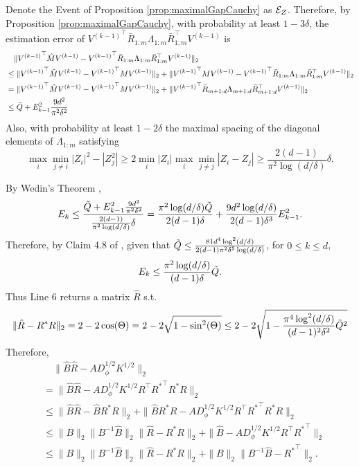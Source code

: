 Denote the Event of Proposition \ref{prop:maximalGapCauchy} as $\mathcal{E}_{Z}$.
Therefore, by Proposition \ref{prop:maximalGapCauchy}, with probability at least $1-3\delta$, 
the estimation error of ${V^{(k-1)}}^\top\bar{R}_{1:m}\Lambda_{1:m} \bar{R}_{1:m}^{\top} V^{(k-1)}$ is 
\begin{align*}
& \quad \| {V^{(k-1)}}^\top \hat{M}V^{(k-1)} - {V^{(k-1)}}^\top\bar{R}_{1:m}\Lambda_{1:m} \bar{R}_{1:m}^{\top} V^{(k-1)} \|_2 \\
& \le \|{V^{(k-1)}}^\top \hat{M}V^{(k-1)} - {V^{(k-1)}}^\top MV^{(k-1)}\|_2 + \| {V^{(k-1)}}^\top MV^{(k-1)} -{V^{(k-1)}}^\top\bar{R}_{1:m}\Lambda_{1:m} \bar{R}_{1:m}^{\top} V^{(k-1)} \|_2 \\
&  = \|{V^{(k-1)}}^\top \hat{M}V^{(k-1)} - {V^{(k-1)}}^\top MV^{(k-1)}\|_2 + \|{V^{(k-1)}}^\top\bar{R}_{m+1:d}\Lambda_{m+1:d}\bar{R}_{m+1:d}^{\top} V^{(k-1)} \|_2 \\
& \le \tilde{Q} + E_{k-1}^2 \frac{9d^2}{\pi^2\delta^2} 
\end{align*}
Also, with probability at least $1-2\delta$ the maximal spacing of the diagonal elements of $\Lambda_{1:m}$ satisfying
\[
\max_i\min_{j\neq i} |Z_i|^2 - |Z_j^2| \ge 2\min_i |Z_i| \max_i\min_{j\neq j} |Z_i - Z_j| \ge \frac{2(d-1)}{\pi^2 \log(d/\delta)}\delta.
\] 



By Wedin's Theorem \citep{stewart1990matrix}, 
\[
E_k \le \frac{\tilde{Q} + E_{k-1}^2 \frac{9d^2}{\pi^2\delta^2} }{\frac{2(d-1)}{\pi^2 \log(d/\delta)}\delta} = \frac{\pi^2 \log(d/\delta)\tilde{Q}}{2(d-1)\delta} + \frac{9d^2 \log(d/\delta)}{2(d-1)\delta^3}E_{k-1}^2.
\]
Therefore, by Claim 4.8 of \citet{vempala2014max}, given that $\tilde{Q}\le  \frac{81d^4\log^2(d/\delta)}{2(d-1)\pi^2\delta^5\log(d/\delta)}$, for $0\le k\le d$,
\[
E_k \le \frac{\pi^2 \log(d/\delta)}{(d-1)\delta} \tilde{Q}. 
\]
Thus Line 6 returns a matrix $\hat{R}$ s.t.
\[
\|\hat{R} - R^*R\|_2 = 2-2\cos(\Theta)= 2 - 2\sqrt{1-\sin^2(\Theta)} \le 2 - 2\sqrt{1-\frac{\pi^4 \log^2(d/\delta)}{(d-1)^2\delta^2} \tilde{Q}^2}
\]
Therefore,
\begin{align*}
& \quad \| \hat{B}\hat{R} - AD_{\phi}^{1/2}K^{1/2}\|_2 \\
& = \| \hat{B}\hat{R} - AD_{\phi}^{1/2}K^{1/2}R^{\top}{R^*}^{\top}R^*R\|_2 \\
& \le \| \hat{B}\hat{R} -  \hat{B}R^*R\|_2 + \|\hat{B}R^*R - AD_{\phi}^{1/2}K^{1/2}R^{\top}{R^*}^{\top}R^*R \|_2 \\
& \le \|B\|_2\|B^{-1}\hat{B}\|_2\|\hat{R} - R^*R\|_2 + \|\hat{B} - AD_{\phi}^{1/2}K^{1/2}R^{\top}{R^*}^{\top}\|_2 \\
& \le  \|B\|_2\|B^{-1}\hat{B}\|_2\|\hat{R} - R^*R\|_2 +\|B\|_2\|B^{-1}\hat{B} - {R^*}^{\top}\|_2.
\end{align*}

